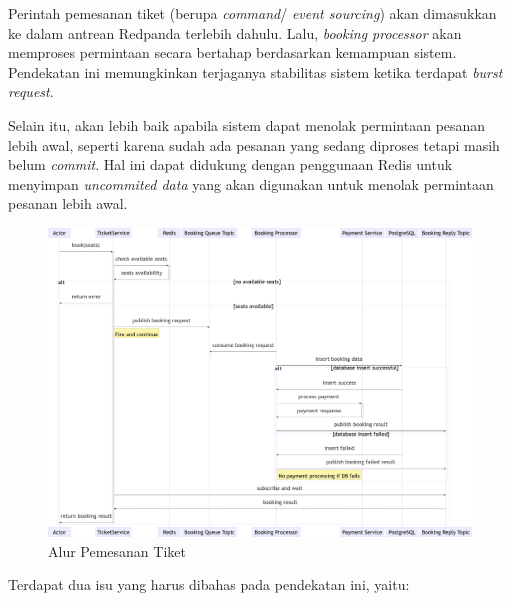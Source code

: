 Perintah pemesanan tiket (berupa \textit{command}/ \textit{event sourcing}) akan dimasukkan ke dalam antrean Redpanda terlebih dahulu. Lalu, \textit{booking processor} akan memproses permintaan secara bertahap berdasarkan kemampuan sistem. Pendekatan ini memungkinkan terjaganya stabilitas sistem ketika terdapat \textit{burst request}.

Selain itu, akan lebih baik apabila sistem dapat menolak permintaan pesanan lebih awal, seperti karena sudah ada pesanan yang sedang diproses tetapi masih belum \textit{commit}. Hal ini dapat didukung dengan penggunaan Redis untuk menyimpan \textit{uncommited data} yang akan digunakan untuk menolak permintaan pesanan lebih awal.

\begin{figure}[htbp]
    \centering
    \includegraphics[width=1\textwidth]{resources/appendix/pgp-purchase-flow.png}
    \caption{Alur Pemesanan Tiket}
    \label{fig:pgp-purchase-flow}
\end{figure}

Terdapat dua isu yang harus dibahas pada pendekatan ini, yaitu:

